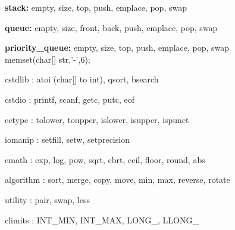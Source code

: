 \documentclass[table]{article}
\begin{document}
\textbf{stack:} empty, size, top, push, emplace, pop, swap

\textbf{queue:} empty, size, front, back, push, emplace, pop, swap

\textbf{priority\_queue:} empty, size, top, push, emplace, pop, swap\\

memset(char[] str,'-',6);

cstdlib : atoi (char[] to int), qsort, bsearch

cstdio : printf, scanf, getc, putc, eof

cctype : tolower, toupper, islower, isupper, ispunct

iomanip : setfill, setw, setprecision

cmath : exp, log, pow, sqrt, cbrt, ceil, floor, round, abs

algorithm : sort, merge, copy, move, min, max, reverse, rotate

utility : pair, swap, less

climits : INT\_MIN, INT\_MAX, LONG\_, LLONG\_\\
\end{document}

